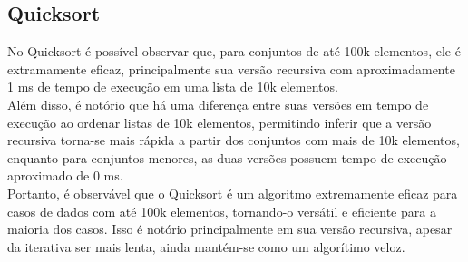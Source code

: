 \subsection{Quicksort}

No Quicksort é possível observar que, para conjuntos de até 100k elementos, ele é extramamente eficaz, principalmente sua versão recursiva com aproximadamente 1 ms de tempo de execução em uma lista de 10k elementos. \\

Além disso, é notório que há uma diferença entre suas versões em tempo de execução ao ordenar listas de 10k elementos, permitindo inferir que a versão recursiva torna-se mais rápida a partir dos conjuntos com mais de 10k elementos, enquanto para conjuntos menores, as duas versões possuem tempo de execução aproximado de 0 ms. \\

Portanto, é observável que o Quicksort é um algoritmo extremamente eficaz para casos de dados com até 100k elementos, tornando-o versátil e eficiente para a maioria dos casos. Isso é notório principalmente em sua versão recursiva, apesar da iterativa ser mais lenta, ainda mantém-se como um algorítimo veloz.